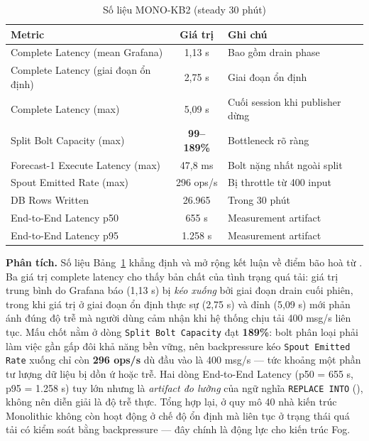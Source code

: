 \documentclass[13pt,a4paper]{report}
\newcommand{\code}[1]{\texttt{\small #1}}
\begin{document}
\begin{table}[H]
\centering
\caption{Số liệu MONO-KB2 (steady 30 phút)}
\label{tab:mono-kb2}
\small
\begin{tabular}{p{} c p{}}
\toprule
\textbf{Metric} & \textbf{Giá trị} & \textbf{Ghi chú} \\
\midrule
Complete Latency (mean Grafana) & 1,13 s & Bao gồm drain phase \\
Complete Latency (giai đoạn ổn định) & 2,75 s & Giai đoạn ổn định \\
Complete Latency (max) & 5,09 s & Cuối session khi publisher dừng \\
Split Bolt Capacity (max) & \textbf{99--189\%} & Bottleneck rõ ràng \\
Forecast-1 Execute Latency (max) & 47,8 ms & Bolt nặng nhất ngoài split \\
Spout Emitted Rate (max) & 296 ops/s & Bị throttle từ 400 input \\
DB Rows Written & 26.965 & Trong 30 phút \\
End-to-End Latency p50 & 655 s & Measurement artifact \\
End-to-End Latency p95 & 1.258 s & Measurement artifact \\
\bottomrule
\end{tabular}
\end{table}

\textbf{Phân tích.} Số liệu Bảng~\ref{tab:mono-kb2} khẳng định và mở rộng kết luận
về điểm bão hoà từ . Ba giá trị complete latency cho thấy bản
chất của tình trạng quá tải: giá trị trung bình do Grafana báo (1,13 s) bị
\textit{kéo xuống} bởi giai đoạn drain cuối phiên, trong khi giá trị ở giai đoạn ổn
định thực sự (2,75 s) và đỉnh (5,09 s) mới phản ánh đúng độ trễ mà người dùng cảm
nhận khi hệ thống chịu tải 400 msg/s liên tục. Mấu chốt nằm ở dòng
\code{Split Bolt Capacity} đạt \textbf{189\%}: bolt phân loại phải làm việc gần gấp
đôi khả năng bền vững, nên backpressure kéo \code{Spout Emitted Rate} xuống chỉ còn
\textbf{296 ops/s} dù đầu vào là 400 msg/s --- tức khoảng một phần tư lượng dữ liệu
bị dồn ứ hoặc trễ. Hai dòng End-to-End Latency (p50 = 655 s, p95 = 1.258 s) tuy
lớn nhưng là \textit{artifact đo lường} của ngữ nghĩa \code{REPLACE INTO}
(), không nên diễn giải là độ trễ thực. Tổng hợp lại, ở quy mô 40
nhà kiến trúc Monolithic không còn hoạt động ở chế độ ổn định mà liên tục ở trạng
thái quá tải có kiểm soát bằng backpressure --- đây chính là động lực cho kiến trúc
Fog.
\end{document}
